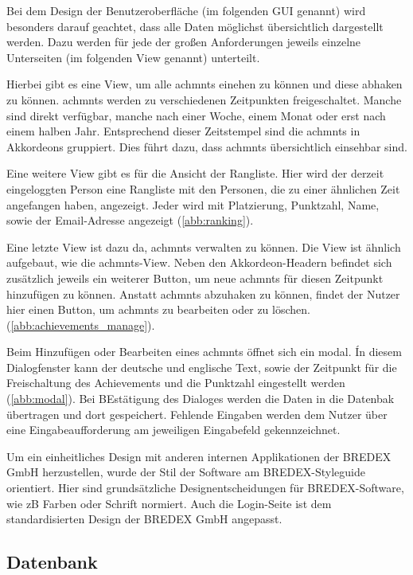 \documentclass[11pt]{article}
\begin{document}

Bei dem Design der Benutzeroberfläche (im folgenden GUI genannt) wird
besonders darauf geachtet, dass alle Daten möglichst übersichtlich
dargestellt werden. Dazu werden für jede der großen Anforderungen
jeweils einzelne Unterseiten (im folgenden View genannt) unterteilt. 

Hierbei gibt es eine View, um alle \glspl{achmnt} einehen zu können
und diese abhaken zu können. \glspl{achmnt} werden zu verschiedenen
Zeitpunkten freigeschaltet. Manche sind direkt verfügbar, manche 
nach einer Woche, einem Monat oder erst nach einem halben Jahr. 
Entsprechend dieser Zeitstempel sind die \glspl{achmnt} in Akkordeons
gruppiert. Dies führt dazu, dass \glspl{achmnt} übersichtlich einsehbar
sind.

Eine weitere View gibt es für die Ansicht der Rangliste. Hier wird
der derzeit eingeloggten Person eine Rangliste mit den Personen, die
zu einer ähnlichen Zeit angefangen haben, angezeigt. Jeder wird mit Platzierung,
Punktzahl, Name, sowie der Email-Adresse angezeigt (\autoref{abb:ranking}).

Eine letzte View ist dazu da, \glspl{achmnt} verwalten zu können.
Die View ist ähnlich aufgebaut, wie die \glspl{achmnt}-View. Neben den Akkordeon-Headern befindet sich
zusätzlich jeweils ein weiterer Button, um neue \glspl{achmnt} für diesen Zeitpunkt
hinzufügen zu können. Anstatt \glspl{achmnt} abzuhaken zu können, findet der Nutzer hier
einen Button, um \glspl{achmnt} zu bearbeiten oder zu löschen. (\autoref{abb:achievements_manage}).

Beim Hinzufügen oder Bearbeiten eines \glspl{achmnt} öffnet sich ein
\Gls{modal}. Ín diesem Dialogfenster kann der deutsche und englische Text, sowie der
Zeitpunkt für die Freischaltung des Achievements und die Punktzahl eingestellt werden (\autoref{abb:modal}). 
Bei BEstätigung des Dialoges werden die Daten in die Datenbak übertragen und dort gespeichert.
Fehlende Eingaben werden dem Nutzer über eine Eingabeaufforderung am jeweiligen Eingabefeld gekennzeichnet.

Um ein einheitliches Design mit anderen internen Applikationen der BREDEX GmbH herzustellen, wurde der Stil der Software
am BREDEX-Styleguide orientiert. Hier sind grundsätzliche Designentscheidungen für BREDEX-Software, wie zB Farben oder Schrift normiert.
Auch die Login-Seite ist dem standardisierten Design der BREDEX GmbH angepasst.

\subsection{Datenbank}
\end{document}
